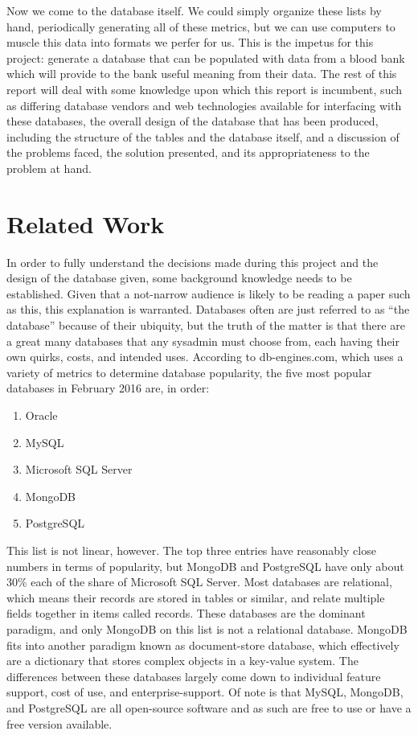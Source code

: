 \documentclass[runningheads,a4paper]{llncs}
\begin{document}
Now we come to the database itself. We could simply organize these
lists by hand, periodically generating all of these metrics, but we
can use computers to muscle this data into formats we perfer for
us. This is the impetus for this project: generate a database that can
be populated with data from a blood bank which will provide to the
bank useful meaning from their data. The rest of this report will deal
with some knowledge upon which this report is incumbent, such as
differing database vendors and web technologies available for
interfacing with these databases, the overall design of the database
that has been produced, including the structure of the tables and the
database itself, and a discussion of the problems faced, the solution
presented, and its appropriateness to the problem at hand.

\section{Related Work}\label{sec:related}
In order to fully understand the decisions made during this project
and the design of the database given, some background knowledge needs
to be established. Given that a not-narrow audience is likely to be
reading a paper such as this, this explanation is warranted. Databases
often are just referred to as ``the database'' because of their
ubiquity, but the truth of the matter is that there are a great many
databases that any sysadmin must choose from, each having their own
quirks, costs, and intended uses. According to db-engines.com, which
uses a variety of metrics to determine database popularity, the five
most popular databases in February 2016\cite{db-engine} are, in order:
\begin{enumerate}
\item Oracle
\item MySQL
\item Microsoft SQL Server
\item MongoDB
\item PostgreSQL
\end{enumerate}
This list is not linear, however. The top three entries have
reasonably close numbers in terms of popularity, but MongoDB and
PostgreSQL have only about 30\% each of the share of Microsoft SQL
Server. Most databases are relational, which means their records are
stored in tables or similar, and relate multiple fields together in
items called records. These databases are the dominant paradigm, and
only MongoDB on this list is not a relational database. MongoDB fits
into another paradigm known as document-store database, which
effectively are a dictionary that stores complex objects in a
key-value system. The differences between these databases largely come
down to individual feature support, cost of use, and
enterprise-support. Of note is that MySQL, MongoDB, and PostgreSQL are
all open-source software and as such are free to use or have a free
version available.
\end{document}
